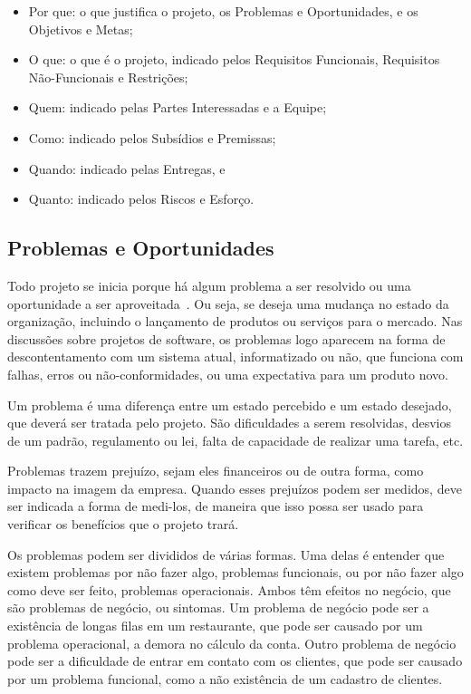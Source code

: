 \documentclass[a4]{report}
\begin{document}
\begin{itemize}
    \item Por que: o que justifica o projeto, os Problemas e Oportunidades, e os Objetivos e Metas;
    \item O que: o que é o projeto, indicado pelos Requisitos Funcionais, Requisitos Não-Funcionais e Restrições;
    \item Quem: indicado pelas Partes Interessadas e a Equipe;
    \item Como: indicado pelos Subsídios e Premissas;
    \item Quando: indicado pelas Entregas, e
    \item Quanto: indicado pelos Riscos e Esforço.
\end{itemize}

\subsection{Problemas e Oportunidades}

Todo projeto se inicia porque há algum problema a ser resolvido ou uma oportunidade a ser aproveitada~\citep{semat:1p2,kerzner:12ed}. Ou seja, se deseja uma mudança no estado da organização, incluindo o lançamento de produtos ou serviços para o mercado. Nas discussões sobre projetos de software, os problemas logo aparecem na forma de descontentamento com um sistema atual, informatizado ou não, que funciona com falhas, erros ou não-conformidades, ou uma expectativa para um produto novo.

Um problema é uma diferença entre um estado percebido e um estado desejado, que deverá ser tratada pelo projeto. São dificuldades a serem resolvidas, desvios de um padrão, regulamento ou lei, falta de capacidade de realizar uma tarefa, etc.

Problemas trazem prejuízo, sejam eles financeiros ou de outra forma, como impacto na imagem da empresa. Quando esses prejuízos podem ser medidos, deve ser indicada a forma de medi-los, de maneira que isso possa ser usado para verificar os benefícios que o projeto trará.

Os problemas podem ser divididos de várias formas. Uma delas é entender que existem problemas por não fazer algo, problemas funcionais, ou por não fazer algo como deve ser feito, problemas operacionais. Ambos têm efeitos no negócio, que são problemas de negócio, ou sintomas. Um problema de negócio pode ser a existência de longas filas em um restaurante, que pode ser causado por um problema operacional, a demora no cálculo da conta. Outro problema de negócio pode ser a dificuldade de entrar em contato com os clientes, que pode ser causado por um problema funcional, como a não existência de um cadastro de clientes.
\end{document}
